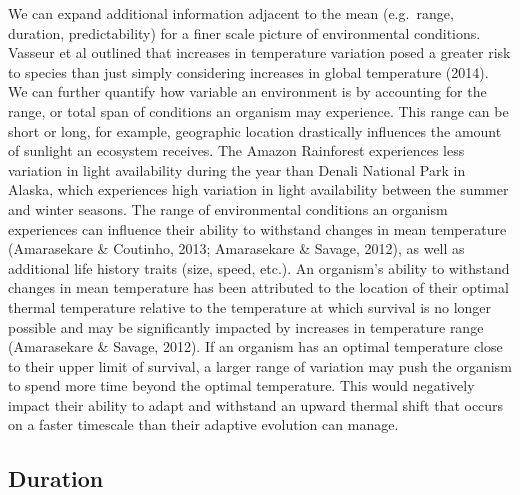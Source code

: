 \documentclass[12pt,twoside]{reedthesis}
\begin{document}
We can expand additional information adjacent to the mean (e.g.~range, duration, predictability) for a finer scale picture of environmental conditions. Vasseur et al outlined that increases in temperature variation posed a greater risk to species than just simply considering increases in global temperature (2014). We can further quantify how variable an environment is by accounting for the range, or total span of conditions an organism may experience. This range can be short or long, for example, geographic location drastically influences the amount of sunlight an ecosystem receives. The Amazon Rainforest experiences less variation in light availability during the year than Denali National Park in Alaska, which experiences high variation in light availability between the summer and winter seasons. The range of environmental conditions an organism experiences can influence their ability to withstand changes in mean temperature (Amarasekare \& Coutinho, 2013; Amarasekare \& Savage, 2012), as well as additional life history traits (size, speed, etc.). An organism's ability to withstand changes in mean temperature has been attributed to the location of their optimal thermal temperature relative to the temperature at which survival is no longer possible and may be significantly impacted by increases in temperature range (Amarasekare \& Savage, 2012). If an organism has an optimal temperature close to their upper limit of survival, a larger range of variation may push the organism to spend more time beyond the optimal temperature. This would negatively impact their ability to adapt and withstand an upward thermal shift that occurs on a faster timescale than their adaptive evolution can manage.

\hypertarget{duration}{%
\subsection{Duration}\label{duration}}
\end{document}
